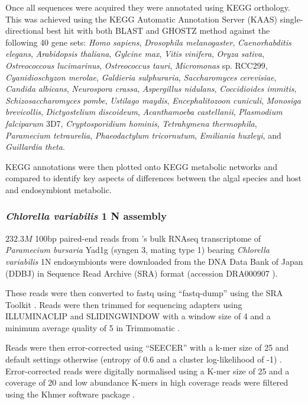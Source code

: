 Once all sequences were acquired they were annotated using KEGG
orthology.  This was achieved 
using the KEGG Automatic Annotation Server (KAAS) \citep{Moriya2007a}
single-directional best hit with both BLAST and GHOSTZ \citep{Suzuki2014,Suzuki2015} 
method against the following 40 gene sets: \textit{Homo sapiens}, 
\textit{Drosophila melanogaster}, \textit{Caenorhabditis elegans},
\textit{Arabidopsis thaliana}, \textit{Gylcine max},
\textit{Vitis vinifera}, \textit{Oryza sativa}, 
\textit{Ostreococcous lucimarinus}, \textit{Ostreococcus tauri},
\textit{Micromonas} sp. RCC299, \textit{Cyanidioschyzon merolae},
\textit{Galdieria sulphuraria}, \textit{Saccharomyces cerevisiae},
\textit{Candida albicans}, \textit{Neurospora crassa}, \textit{Aspergillus nidulans},
\textit{Coccidioides immitis}, \textit{Schizosaccharomyces pombe},
\textit{Ustilago maydis}, \textit{Encephalitozoon cuniculi},
\textit{Monosiga brevicollis}, \textit{Dictyostelium discoideum}, 
\textit{Acanthamoeba castellanii}, \textit{Plasmodium falciparum} 3D7, 
\textit{Cryptosporidium hominis}, \textit{Tetrahymena thermophila},
\textit{Paramecium tetraurelia}, \textit{Phaeodactylum tricornutum},
\textit{Emiliania huxleyi}, and \textit{Guillardia theta}.

KEGG annotations were then plotted onto KEGG metabolic networks and compared 
to identify key aspects of differences between the algal species and
host and endosymbiont metabolic.

\subsubsection{\textit{Chlorella variabilis} 1 N assembly}
\(232.3M\) 100bp paired-end reads from \citep{Kodama2014}'s 
bulk RNAseq transcriptome of \textit{Paramecium bursaria} Yad1g (syngen
3, mating type 1) bearing \textit{Chlorella variabilis} 1N endosymbionts
were downloaded from the DNA Data Bank of Japan (DDBJ) \citep{Tateno2002,Kaminuma2011}
in Sequence Read Archive (SRA) format \citep{Leinonen2011,KodamaNRA2012b} (accession DRA000907 \citep{Kodama2014}).

These reads were then converted to fastq using ``fastq-dump'' using the SRA Toolkit
\citep{NationalCenterforBiotechnologyInformation2011}.  Reads were then trimmed
for sequencing adapters using ILLUMINACLIP and SLIDINGWINDOW with a window size
of 4 and a minimum average quality of 5 in Trimmomatic \citep{Bolger2014a}.

Reads were then error-corrected using ``SEECER'' with a k-mer size of 25 and 
default settings otherwise (entropy of 0.6 and a cluster log-likelihood
of -1) \citep{Le2013}.  Error-corrected reads were digitally normalised
using a K-mer size of 25 and a coverage of 20 \citep{Brown2012} and 
low abundance K-mers in high coverage reads were filtered \citep{Zhang2014,Zhang2015}
using the Khmer software package \citep{Doring2008,Crusoe2015}.


